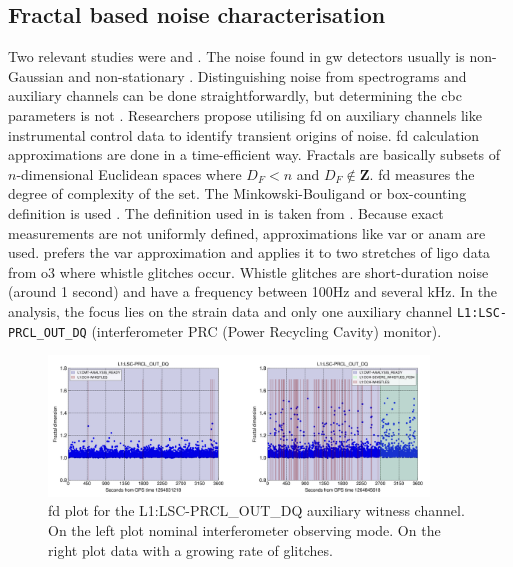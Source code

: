 \subsection{Fractal based noise characterisation}
Two relevant studies were \citep{cavaglia2022characterization} and \citep{laguarta2023detection}. The noise found in \acrshort{gw} detectors usually is non-Gaussian and non-stationary \citep{abbott2020guide}. Distinguishing noise from spectrograms and auxiliary channels can be done straightforwardly, but determining the \acrshort{cbc} parameters is not \citep{powell2018parameter}. Researchers \citep{cavaglia2022characterization} propose utilising \acrfull{fd} on auxiliary channels like instrumental control data to identify transient origins of noise. \acrshort{fd} calculation approximations are done in a time-efficient way. Fractals are basically subsets of $n$-dimensional Euclidean spaces \citep{mandelbrot1989fractal} where $D_{F} < n$ and $D_{F} \not\in \mathbf{Z}$. \acrshort{fd} measures the degree of complexity of the set. The Minkowski-Bouligand or box-counting definition is used \citep{weisstein2019minkowski}. The definition used in \citep{cavaglia2022characterization} is taken from \citep{dubuc1989evaluating}. 
Because exact measurements are not uniformly defined, approximations like \acrfull{var} or \acrfull{anam} are used.\citep{cavaglia2022characterization} prefers the \acrshort{var} approximation and applies it to two stretches of \acrshort{ligo} data from \acrshort{o3} where whistle glitches occur. Whistle glitches are short-duration noise (around 1 second) and have a frequency between 100Hz and several kHz.  In the analysis, the focus lies on the strain data and only one auxiliary channel \verb|L1:LSC-PRCL_OUT_DQ| (interferometer PRC (Power Recycling Cavity) monitor). 
\begin{figure}[H]
    \centering
    \includegraphics[width=0.9\textwidth]{Images/fd_L1_LSC_PRCL_OUT_DQ.png}
    \caption{\acrshort{fd} plot for the L1:LSC-PRCL\_OUT\_DQ auxiliary witness channel. On the left plot nominal interferometer observing mode. On the right plot data with a growing rate of glitches. \citep{cavaglia2022characterization} }
    \label{fig:fd_L1_LSC_PRCL}
\end{figure}
